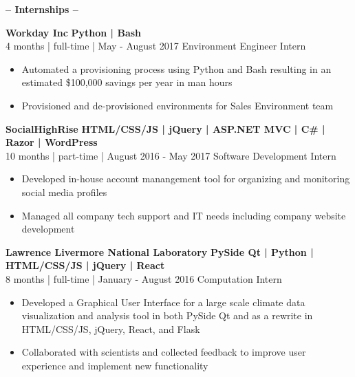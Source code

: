 \documentclass[12pt]{article}
\begin{document}
    \begin{center}
    \textbf{\Large-- Internships --}\\
    \end{center}
    \vspace{-5mm}

    \begin{footnotesize}
    \flushleft
    \textbf{\color{primary}\large Workday Inc} \hfill \textbf{\color{Cerulean}Python | Bash}\\ 
    {\color{primary}4 months | full-time | May - August 2017} \hfill {\color{Cerulean} Environment Engineer Intern}
    \vspace{-2mm}
    \begin{itemize}
        \setlength{\itemsep}{0pt}
        \item Automated a provisioning process using Python and Bash resulting in an estimated \$100,000 savings per year in man hours
        \item Provisioned and de-provisioned environments for Sales Environment team
    \end{itemize}
    \textbf{\color{primary}\large SocialHighRise} \hfill  \textbf{\color{Cerulean}HTML/CSS/JS | jQuery | ASP.NET MVC | C\# | Razor | WordPress } \\ 
    {\color{primary}10 months | part-time | August 2016 - May 2017} \hfill {\color{Cerulean} Software Development Intern}
    \vspace{-2mm}
    \begin{itemize}
        \setlength{\itemsep}{0pt}
        \item Developed in-house account manangement tool for organizing and monitoring social media profiles
        \item Managed all company tech support and IT needs including company website development
    \end{itemize}
    \textbf{\color{primary}\large Lawrence Livermore National Laboratory} \hfill \textbf{\color{Cerulean}PySide Qt | Python | HTML/CSS/JS | jQuery | React}\\
    {\color{primary}8 months | full-time | January - August 2016} \hfill {\color{Cerulean} Computation Intern}
    \vspace{-2mm}
    \begin{itemize}
        \setlength{\itemsep}{0pt}
        \item Developed a Graphical User Interface for a large scale climate data visualization and analysis tool in both PySide Qt and as a rewrite in HTML/CSS/JS, jQuery, React, and Flask

        \item Collaborated with scientists and collected feedback to improve user experience and implement new functionality
    \end{itemize}

    \end{footnotesize}
    
\end{document}
